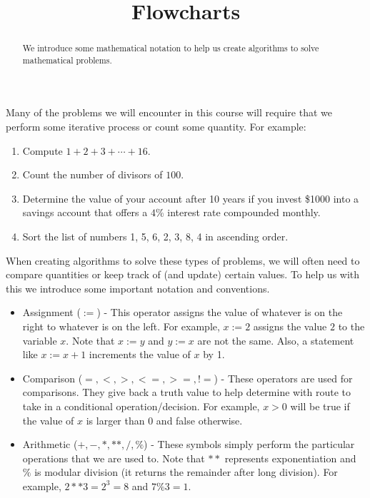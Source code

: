 \documentclass{ximera}
\title{Flowcharts}
\begin{document}
  
\begin{abstract}  
We introduce some mathematical notation to help us create algorithms to solve mathematical problems. 
\end{abstract}  
\maketitle

Many of the problems we will encounter in this course will require that we perform some iterative process or count some quantity. For example:

\begin{enumerate}
	\item Compute $1+2+3+\cdots+16$.
	\item Count the number of divisors of $100$.
	\item Determine the value of your account after 10 years if you invest \$1000 into a savings account that offers a $4$\% interest rate compounded monthly.
	\item Sort the list of numbers 1, 5, 6, 2, 3, 8, 4 in ascending order.
\end{enumerate}

When creating algorithms to solve these types of problems, we will often need to compare quantities or keep track of (and update) certain values. To help us with this we introduce some important notation and conventions.

\begin{itemize}
	\item Assignment ($:=$) - This operator assigns the value of whatever is on the right to whatever is on the left. For example, $x:=2$ assigns the value $2$ to the variable $x$. Note that $x:=y$ and $y:=x$ are not the same. Also, a statement like $x:=x+1$ increments the value of $x$ by 1.
	\item Comparison ($=,<,>,<=,>=,!=$) - These operators are used for comparisons. They give back a truth value to help determine with route to take in a conditional operation/decision. For example, $x>0$ will be true if the value of $x$ is larger than $0$ and false otherwise.
	\item Arithmetic ($+,-,*,**,/,\%$) - These symbols simply perform the particular operations that we are used to. Note that $**$ represents exponentiation and $\%$ is modular division (it returns the remainder after long division). For example, $2**3 = 2^3 = 8$ and $7\%3 = 1$.
\end{itemize}
\end{document}

